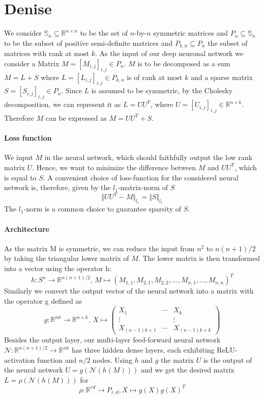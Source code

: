\section{Denise}\label{sec:algorithm}

We consider $\mathbb{S}_n \subseteq \mathbb{R}^{n \times n}$ to be the set of $n$-by-$n$ symmetric matrices and $P_n\subseteq \mathbb{S}_n$ to be the subset of positive semi-definite matrices and $P_{k,n} \subseteq P_n$ the subset of matrices with rank at most $k$. As the input of our deep neuronal network we consider a Matrix $M = [M_{i,j}]_{i,j} \in P_n$. $M$ is to be decomposed as a sum $M = L + S$ where $L = [L_{i,j}]_{i,j} \in P_{k,n}$ is of rank at most $k$ and a sparse matrix $S = [S_{i,j}]_{i,j} \in P_n$. Since $L$ is assumed to be symmetric, by the Cholesky decomposition, we can represent it as $L=UU^T$, where $U = [U_{i,j}]_{i,j} \in \mathbb{R}^{n \times k}$. Therefore $M$ can be expressed as $M = UU^T + S$.

\paragraph{Loss function}
We input $M$ in the neural network, which should faithfully output the low rank matrix $U$. Hence, we want to minimize the difference between $M$ and $UU^T$, which is equal to $S$. A convenient choice of loss-function for the considered neural network is, therefore, given by the $l_1$-matrix-norm of $S$
\[
\Vert UU^T - M \Vert_{l_1} = \Vert S \Vert_{l_1}
\]
The $l_1$-norm is a common choice to guarantee sparsity of $S$.

\paragraph{Architecture}
As the matrix M is symmetric, we can reduce the input from $n^2$ to $n(n + 1)/2$ by taking the triangular lower matrix of $M$. The lower matrix is then transformed into a vector using the operator h:
\[
h: S^n \to \mathbb{R}^{n(n+1)/2}, \, M \mapsto (M_{1,1},M_{2,1},M_{2,2},\dots,M_{n,1},\dots,M_{n,n})^T
\]
Similarly we convert the output vector of the neural network into a matrix with the operator g defined as
\[
g : \mathbb{R}^{nk} \to \mathbb{R}^{n \times k}, \, X \mapsto \begin{pmatrix} X_1 & \cdots & X_k \\ \vdots & & \vdots \\ X_{(n-1)k + 1} & \cdots& X_{(n-1)k+k}\end{pmatrix}
\]
Besides the output layer, our multi-layer feed-forward neural network $\mathcal{N}: \mathbb{R}^{n(n+1)/2} \to \mathbb{R}^{nk} $ has three hidden dense layers, each exhibiting ReLU-activation function and $n/2$ nodes. Using $h$ and $g$ the matrix $U$ is the output of the neural network $U = g(\mathcal{N}(h(M)))$ and we  get the desired matrix $L=\rho(\mathcal{N}(h(M)))$ for
\[
\rho : \mathbb{R}^{rd} \to P_{r,d}, X \mapsto g(X)g(X)^T
\]


